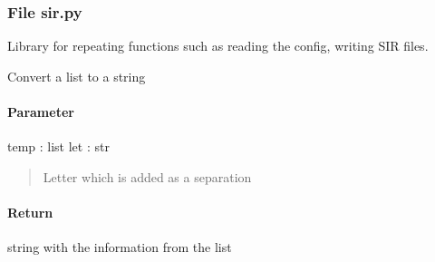 \documentclass[letterpaper,10pt,english]{sphinxmanual}
\begin{document}
\subsubsection{File sir.py}
\label{\detokenize{functions:file-sir-py}}
\sphinxAtStartPar
Library for repeating functions such as reading the config, writing SIR files.

\begin{fulllineitems}
\label{\detokenize{functions:sir.list_to_string}}
\pysigstartsignatures
{}
\pysigstopsignatures
\sphinxAtStartPar
Convert a list to a string


\paragraph{Parameter}
\label{\detokenize{functions:parameter}}
\sphinxAtStartPar
temp : list
let : str
\begin{quote}

\sphinxAtStartPar
Letter which is added as a separation
\end{quote}


\paragraph{Return}
\label{\detokenize{functions:return}}
\sphinxAtStartPar
string with the information from the list

\end{fulllineitems}

\end{document}
